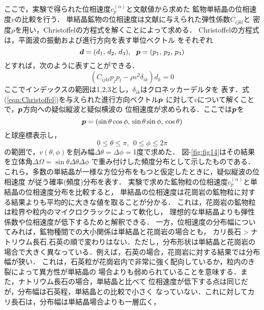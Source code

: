 ここで，実験で得られた位相速度$c_p^{(\alpha)}$と文献値\cite{AGU}から求めた
鉱物単結晶の位相速度$v$の比較を行う．
単結晶鉱物の位相速度は文献に与えられた弾性係数$C_{ijkl}$と
密度$\rho$を用い，Christoffelの方程式を解くことによって求める．
Christoffelの方程式は，平面波の振動および進行方向を表す単位ベクトル
をそれぞれ
\begin{equation}
	\fat{d}=(d_1,\, d_2,\, d_3), \ \ 
	\fat{p}=(p_1,\, p_2,\, p_3)
	\label{eqn:unit_vecs}
\end{equation}
とすれば，次のように表すことができる．
\begin{equation}
	\left( C_{ijkl}p_j p_l - \rho v^2 \delta_{ik} \right)d_k=0
	\label{eqn:Christoffel}
\end{equation}
ここでインデックスの範囲は1,2,3とし，$\delta_{ik}$はクロネッカーデルタを
表す．式(\ref{eqn:Christoffel})を与えられた進行方向ベクトル$\mbox{\boldmath{$p$}}$
に対して$v$について解くことで，$\mbox{\boldmath{$p$}}$方向への疑似縦波と疑似横波の
位相速度が求められる．ここでは$\mbox{\boldmath{$p$}}$を
\begin{equation}
	\fat{p}=\left(
		\sin\theta \cos\phi, \,
		\sin\theta \sin\phi, \,
		\cos\theta
	\right)
	\label{eqn:p_polar}
\end{equation}
と球座標表示し，
\begin{equation}
	0 \leq \theta \leq \pi, \ \ 
	0 \leq \phi \leq 2\pi
	\label{eqn:}
\end{equation}
の範囲で，$v(\theta, \phi)$を刻み幅$\Delta \theta=\Delta \phi =$1度で求めた．
図-\ref{fig:fig14}はその結果を立体角$\Delta \Omega = \sin\theta \Delta \theta \Delta \phi$
で重み付けした頻度分布として示したものである．
これら，多数の単結晶が一様な方位分布をもつと仮定したときに，疑似縦波の位相速度
が従う確率(頻度)分布を表す．
実験で求めた鉱物粒の位相速度$c^{(\alpha)}_p$と単結晶の位相速度分布を比較すると，
単結晶の位相速度は花崗岩の鉱物粒に対する結果よりも平均的に大きな値を取ることが分かる．
これは，花崗岩の鉱物粒は粒界や粒内のマイクロクラックによって軟化し，
理想的な単結晶よりも弾性係数や位相速度が低下するためと解釈できる．
一方，位相速度の分布幅についてみれば，鉱物種間での大小関係は単結晶と花崗岩の場合とも，
カリ長石$>$ナトリウム長石$.$石英の順で変わりはない．ただし，分布形状は単結晶と花崗岩の
場合で大きく異なっている．例えば，石英の場合，花崗岩に対する結果では分布幅が狭い．
これは，石英粒が花崗岩内で非常に強く配向しているか，粒内のき裂によって異方性が単結晶の
場合よりも弱められていることを意味する．また，ナトリウム長石の場合，単結晶と比べて
位相速度が低下する点は同じだが，分布幅は石英程，単結晶との比較で小さく
なっていない．これに対してカリ長石は，分布幅は単結晶場合よりも一層広く，
